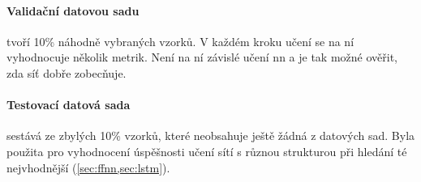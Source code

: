         \paragraph{Validační datovou sadu} tvoří 10\% náhodně vybraných vzorků. V každém kroku učení se na ní vyhodnocuje několik metrik. Není na ní závislé učení \acrshort{nn} a je tak možné ověřit, zda síť dobře zobecňuje.
        \paragraph{Testovací datová sada} sestává ze zbylých 10\% vzorků, které neobsahuje ještě žádná z datových sad. Byla použita pro vyhodnocení úspěšnosti učení sítí s různou strukturou při hledání té nejvhodnější (\cref{sec:ffnn,sec:lstm}).
            \label{ssec:test}